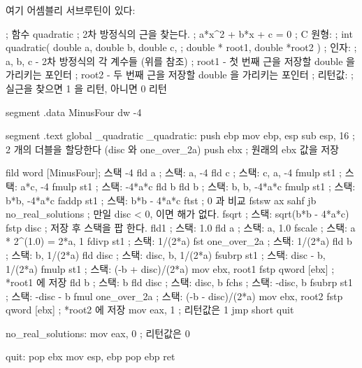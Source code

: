 여기 어셈블리 서브루틴이 있다:
\begin{AsmCodeListing}[label=quad.asm,commentchar=$]
; 함수 quadratic
; 2차 방정식의 근을 찾는다.  
;       a*x^2 + b*x + c = 0
; C 원형:
;   int quadratic( double a, double b, double c,
;                  double * root1, double *root2 )
; 인자:
;   a, b, c - 2차 방정식의 각 계수들 (위를 참조)
;   root1   - 첫 번째 근을 저장할 double 을 가리키는 포인터 
;   root2   - 두 번째 근을 저장할 double 을 가리키는 포인터 
; 리턴값:
;  실근을 찾으면 1 을 리턴, 아니면 0 리턴


segment .data
MinusFour       dw      -4

segment .text
        global  _quadratic
_quadratic:
        push    ebp
        mov     ebp, esp
        sub     esp, 16         ; 2 개의 더블을 할당한다 (disc 와 one_over_2a)
        push    ebx             ; 원래의 ebx 값을 저장

        fild    word [MinusFour]; 스택 -4
        fld     a               ; 스택: a, -4
        fld     c               ; 스택: c, a, -4
        fmulp   st1             ; 스택: a*c, -4
        fmulp   st1             ; 스택: -4*a*c
        fld     b
        fld     b               ; 스택: b, b, -4*a*c
        fmulp   st1             ; 스택: b*b, -4*a*c
        faddp   st1             ; 스택: b*b - 4*a*c
        ftst                    ; 0 과 비교
        fstsw   ax
        sahf
        jb      no_real_solutions ; 만일 disc < 0, 이면 해가 없다.
        fsqrt                   ; 스택: sqrt(b*b - 4*a*c)
        fstp    disc            ; 저장 후 스택을 팝 한다.
        fld1                    ; 스택: 1.0
        fld     a               ; 스택: a, 1.0
        fscale                  ; 스택: a * 2^(1.0) = 2*a, 1
        fdivp   st1             ; 스택: 1/(2*a)
        fst     one_over_2a     ; 스택: 1/(2*a)
        fld     b               ; 스택: b, 1/(2*a)
        fld     disc            ; 스택: disc, b, 1/(2*a)
        fsubrp  st1             ; 스택: disc - b, 1/(2*a)
        fmulp   st1             ; 스택: (-b + disc)/(2*a)
        mov     ebx, root1
        fstp    qword [ebx]     ;  *root1 에 저장
        fld     b               ; 스택: b
        fld     disc            ; 스택: disc, b
        fchs                    ; 스택: -disc, b
        fsubrp  st1             ; 스택: -disc - b
        fmul    one_over_2a     ; 스택: (-b - disc)/(2*a)
        mov     ebx, root2
        fstp    qword [ebx]     ; *root2 에 저장
        mov     eax, 1          ; 리턴값은 1
        jmp     short quit

no_real_solutions:
        mov     eax, 0          ; 리턴값은 0

quit:
        pop     ebx
        mov     esp, ebp
        pop     ebp
        ret
\end{AsmCodeListing}

